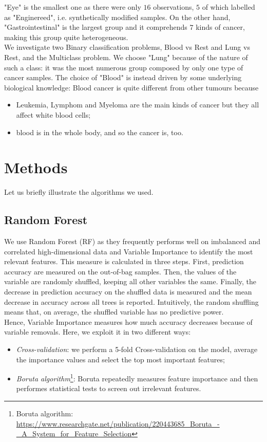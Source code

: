 \documentclass[a4paper,11pt, oneside]{article}  %
\begin{document}
"Eye" is the smallest one as there were only $16$ observations, $5$ of which labelled as "Enginereed", i.e.  synthetically modified samples. On the other hand, "Gastrointestinal" is the largest group and it comprehends $7$ kinds of cancer,  making this group quite heterogeneous. \\
We investigate two Binary classification problems,  Blood vs Rest and Lung vs Rest, and the Multiclass problem. We choose "Lung" because of the nature of such a class: it was the most numerous group composed by only one type of cancer samples. The choice of "Blood" is instead driven by some underlying biological knowledge: Blood cancer is quite different from other tumours because
\begin{itemize}
	\item Leukemia, Lymphom and Myeloma are the main kinds of cancer but they all affect white blood cells;
	\item blood is in the whole body, and so the cancer is, too.
\end{itemize} 

\section{Methods}
Let us briefly illustrate the algorithms we used. 

\subsection{Random Forest}
We use Random Forest (RF) as they frequently performs well on imbalanced and correlated high-dimensional data and Variable Importance to identify the most relevant features.  This measure is calculated in three steps. First, prediction accuracy are measured on the out-of-bag samples. Then, the values of the variable are randomly shuffled, keeping all other variables the same.  Finally, the decrease in prediction accuracy on the shuffled data is measured and the mean decrease in accuracy across all trees is reported.  Intuitively, the random shuffling means that, on average, the shuffled variable has no predictive power. \\
Hence, Variable Importance measures how much accuracy decreases because of variable removals. Here, we exploit it in two different ways:
\begin{itemize}
	\item \textit{Cross-validation}: we perform a 5-fold Cross-validation on the model, average the importance values and select the top most important features;
	\item \textit{Boruta algorithm}\footnote{Boruta algorithm: \url{https://www.researchgate.net/publication/220443685_Boruta_-_A_System_for_Feature_Selection}}: Boruta repeatedly measures feature importance and then performes statistical tests to screen out irrelevant features. 
\end{itemize} 
\end{document}
